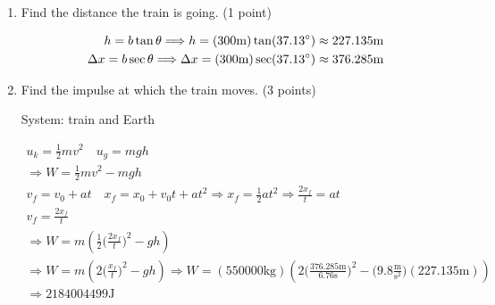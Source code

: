 \documentclass{article}
\begin{document}
\begin{enumerate}
    \item Find the distance the train is going. (1 point)


\begin{align*}
    h=b\tan\theta 
    \Longrightarrow h=(300\text{m})\tan(37.13\degree) \approx 227.135\text{m}
    \\
    \Delta x=b\sec\theta
    \Longrightarrow \Delta x=(300\text{m})\sec(37.13\degree) \approx 376.285\text{m}
\end{align*}

\item Find the impulse at which the train moves. (3 points)

System: train and Earth

\begin{align*}
    u_k=\frac{1}{2}mv^2 \quad u_g=mgh \\
    \Longrightarrow W=\frac{1}{2}mv^2-mgh \\
    v_f=v_0+at 
    \quad x_f=x_0+v_0t+at^2 \Longrightarrow x_f=\frac{1}{2}at^2 \Longrightarrow \frac{2x_f}{t}=at \\
    v_f=\frac{2x_f}{t} \\
    \Longrightarrow W=m(\frac{1}{2}\biggr(\frac{2x_f}{t}\biggr)^2-gh) \\
    \Longrightarrow W=m(2\biggr(\frac{x_f}{t}\biggr)^2-gh)
    \Longrightarrow W=(550000\text{kg})(2\biggr(\frac{376.285\text{m}}{6.76\text{s}}\biggr)^2-\biggr(9.8\frac{\text{m}}{\text{s}^2}\biggr)(227.135\text{m})) \\
    \Longrightarrow 2184004499 \text{J}
\end{align*}

\end{enumerate}
\end{document}
